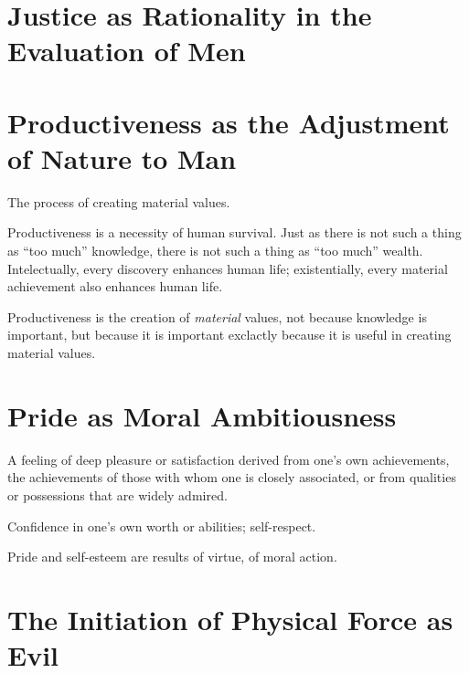     \section{Justice as Rationality in the Evaluation of Men}

        

    \section{Productiveness as the Adjustment of Nature to Man}

        \begin{definition}[Productiveness]
        \label{def:productiveness}
            The process of creating material values.
        \end{definition}

        Productiveness is a necessity of human survival. Just as there is not such a thing as ``too much'' knowledge, there is not such a thing as ``too much'' wealth. Intelectually, every discovery enhances human life; existentially, every material achievement also enhances human life.

        Productiveness is the creation of \textit{material} values, not because knowledge is important, but because it is important exclactly because it is useful in creating material values.

    \section{Pride as Moral Ambitiousness}

        \begin{definition}[Pride]
            A feeling of deep pleasure or satisfaction derived from one's own achievements, the achievements of those with whom one is closely associated, or from qualities or possessions that are widely admired.
        \end{definition}

        \begin{definition}
            Confidence in one's own worth or abilities; self-respect.
        \end{definition}

        Pride and self-esteem are results of virtue, of moral action.


    \section{The Initiation of Physical Force as Evil}


